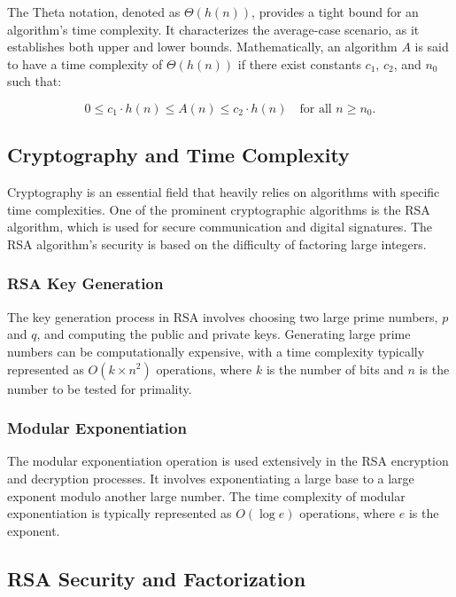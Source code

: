 \documentclass{article}
\begin{document}
The Theta notation, denoted as \(\Theta(h(n))\), provides a tight bound for an algorithm's time complexity. It characterizes the average-case scenario, as it establishes both upper and lower bounds. Mathematically, an algorithm \(A\) is said to have a time complexity of \(\Theta(h(n))\) if there exist constants \(c_1\), \(c_2\), and \(n_0\) such that:

\[ 0 \leq c_1 \cdot h(n) \leq A(n) \leq c_2 \cdot h(n) \quad \text{for all } n \geq n_0. \]

\subsection{Cryptography and Time Complexity}

Cryptography is an essential field that heavily relies on algorithms with specific time complexities. One of the prominent cryptographic algorithms is the RSA algorithm, which is used for secure communication and digital signatures. The RSA algorithm's security is based on the difficulty of factoring large integers.

\subsubsection{RSA Key Generation}

The key generation process in RSA involves choosing two large prime numbers, \(p\) and \(q\), and computing the public and private keys. Generating large prime numbers can be computationally expensive, with a time complexity typically represented as \(O(k \times n^2)\) operations, where \(k\) is the number of bits and \(n\) is the number to be tested for primality.

\subsubsection{Modular Exponentiation}

The modular exponentiation operation is used extensively in the RSA encryption and decryption processes. It involves exponentiating a large base to a large exponent modulo another large number. The time complexity of modular exponentiation is typically represented as \(O(\log e)\) operations, where \(e\) is the exponent.

\subsection{RSA Security and Factorization}
\end{document}
